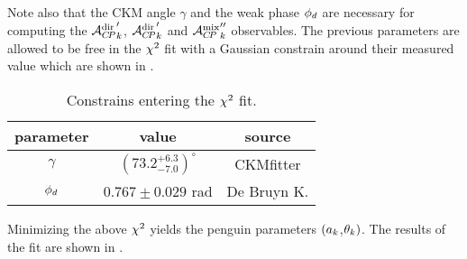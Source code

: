 \noindent Note also that the CKM angle $\gamma$ and the weak phase $\phi_{d}$ are necessary for computing the ${\mathcal{A}_{C\!P}^{\rm dir}}'_k$,
${\mathcal{A}_{C\!P}^{\rm dir}}'_k$ and ${\mathcal{A}_{C\!P}^{\rm mix}}''_k$ observables. The previous parameters are allowed to be free in the
$\chi^2$ fit with a Gaussian constrain around their measured value which are shown in .

\begin{table}[!h]
  \center
  \begin{tabular}{c c c}
    \hline
    parameter & value & source \\
    \hline
    $\gamma$      & $\left(73.2_{-7.0}^{+6.3}\right)^{\circ}$ & CKMfitter \cite{Charles:2015gya} \\
    $\phi_{d}$       & $0.767 \pm 0.029$ rad & De Bruyn K.\cite{DeBruyn-thesis} \\
    \hline
  \end{tabular}
  \caption{\small Constrains entering the $\chi^2$ fit.}
  \label{chi2_fit_constrains}
\end{table}

\noindent Minimizing the above $\chi^2$ yields the penguin parameters $(a_k$,$\theta_k)$.
The results of the fit are shown in .
